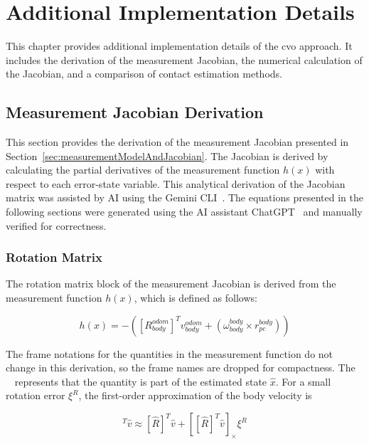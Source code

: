 \documentclass[report.tex]{subfiles}
\begin{document}
    \chapter{Additional Implementation Details}
    
    This chapter provides additional implementation details of the \gls{cvo} approach. It includes the derivation of the measurement Jacobian, the numerical calculation of the Jacobian, and a comparison of contact estimation methods. 
    
    \section{Measurement Jacobian Derivation} \label{appendix:MeasurementJacobianDerivation}
    
    This section provides the derivation of the measurement Jacobian presented in Section~\ref{sec:measurementModelAndJacobian}. The Jacobian is derived by calculating the partial derivatives of the measurement function $h(x)$ with respect to each error-state variable. This analytical derivation of the Jacobian matrix was assisted by AI using the Gemini CLI~\cite{geminicli2026}. The equations presented in the following sections were generated using the AI assistant ChatGPT~\cite{openai_chatgpt_jacobian_2026} and manually verified for correctness. 
    
    \subsection{Rotation Matrix}

    The rotation matrix block of the measurement Jacobian is derived from the measurement function $h(x)$, which is defined as follows:

    \begin{equation}
    h(x) =
    -\left(
    [R_{body}^{odom}]^{T}v_{body}^{odom}
    +
    \left(\omega_{body}^{body}\times r_{pc}^{body}\right)
    \right)
    \end{equation}

    The frame notations for the quantities in the measurement function do not change in this derivation, so the frame names are dropped for compactness. The $\widehat{\phantom{x}}$ represents that the quantity is part of the estimated state $\hat x$.
    For a small rotation error $\xi^R$, the first-order approximation of the body velocity is
        
    \begin{equation}
        [\hat R_{\mathrm{pert}}]^{T}\hat v
        \approx
        [\hat R]^{T}\hat v
        +
        \left[
        [\hat R]^{T}\hat v
        \right]_{\times}\xi^R
    \end{equation}
\end{document}
